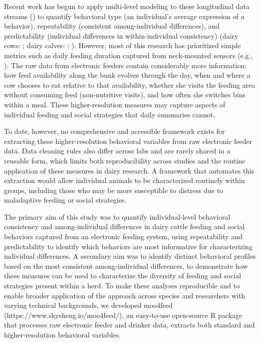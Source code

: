 \documentclass[
]{article}
\begin{document}
Recent work has begun to apply multi-level modeling to these
longitudinal data streams () to quantify behavioral type (an individual's average expression
of a behavior), repeatability (consistent among-individual differences),
and predictability (individual differences in within-individual
consistency) (dairy cows: ; dairy calves: ; ). However,
most of this research has prioritized simple metrics such as daily
feeding duration captured from neck-mounted sensors (e.g.,
). The raw data from
electronic feeders contain considerably more information: how feed
availability along the bunk evolves through the day, when and where a
cow chooses to eat relative to that availability, whether she visits the
feeding area without consuming feed (non-nutritive visits), and how
often she switches bins within a meal. These higher-resolution measures
may capture aspects of individual feeding and social strategies that
daily summaries cannot.

To date, however, no comprehensive and accessible framework exists for
extracting these higher-resolution behavioral variables from raw
electronic feeder data. Data cleaning rules also differ across labs and
are rarely shared in a reusable form, which limits both reproducibility
across studies and the routine application of these measures in dairy
research. A framework that automates this extraction would allow
individual animals to be characterized routinely within groups,
including those who may be more susceptible to distress due to
maladaptive feeding or social strategies.

The primary aim of this study was to quantify individual-level
behavioral consistency and among-individual differences in dairy cattle
feeding and social behaviors captured from an electronic feeding system,
using repeatability and predictability to identify which behaviors are
most informative for characterizing individual differences. A secondary
aim was to identify distinct behavioral profiles based on the most
consistent among-individual differences, to demonstrate how these
measures can be used to characterize the diversity of feeding and social
strategies present within a herd. To make these analyses reproducible
and to enable broader application of the approach across species and
researchers with varying technical backgrounds, we developed moo4feed
(https://www.skysheng.io/moo4feed/), an easy-to-use open-source R
package that processes raw electronic feeder and drinker data, extracts
both standard and higher-resolution behavioral variables.
\end{document}
